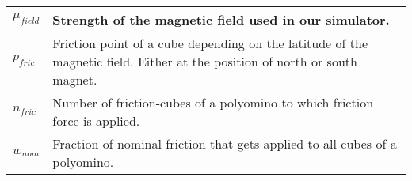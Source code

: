 \begin{xltabular}{\textwidth}{ l  X }
	$\mu_\textit{field}$
	&
	Strength of the magnetic field used in our simulator.
	\\ \midrule
	
	$p_\textit{fric}$
	&
	Friction point of a cube depending on the latitude of the magnetic field.
	Either at the position of north or south magnet.
	\\ \midrule
	
	$n_\textit{fric}$
	&
	Number of friction-cubes of a polyomino to which friction force is applied.
	\\ \midrule
	
	$w_\textit{nom}$
	&
	Fraction of nominal friction that gets applied to all cubes of a polyomino.
	\\ \bottomrule
	
\end{xltabular}
